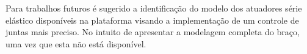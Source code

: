 Para trabalhos futuros é sugerido a identificação do modelo dos atuadores série elástico disponíveis na plataforma visando a implementação de um controle de juntas mais preciso. No intuito de apresentar a modelagem completa do braço, uma vez que esta não está disponível. 




